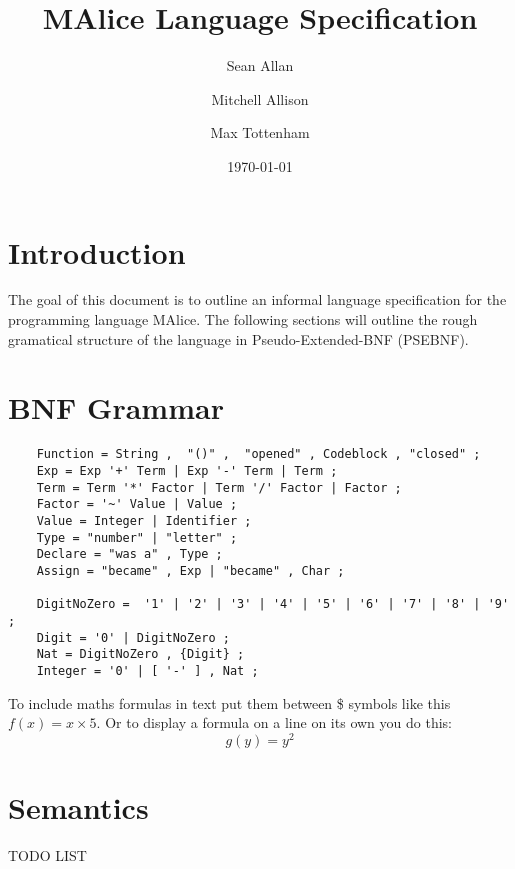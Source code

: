 \documentclass[a4wide, 11pt]{article}
\begin{document}
\title{MAlice Language Specification}

\author{Sean Allan \and Mitchell Allison \and Max Tottenham}

\date{\today}         %

\maketitle            %

\section{Introduction}

The goal of this document is to outline an informal language specification for 
the programming language MAlice. The following sections will outline the rough
gramatical structure of the language in Pseudo-Extended-BNF (PSEBNF). 

\section{BNF Grammar} 

\begin{verbatim}
	Function = String ,  "()" ,  "opened" , Codeblock , "closed" ;
	Exp = Exp '+' Term | Exp '-' Term | Term ;
	Term = Term '*' Factor | Term '/' Factor | Factor ;
	Factor = '~' Value | Value ;
	Value = Integer | Identifier ;
	Type = "number" | "letter" ;
	Declare = "was a" , Type ;
	Assign = "became" , Exp | "became" , Char ;
	
	DigitNoZero =  '1' | '2' | '3' | '4' | '5' | '6' | '7' | '8' | '9' ;
	Digit = '0' | DigitNoZero ; 
	Nat = DigitNoZero , {Digit} ;
	Integer = '0' | [ '-' ] , Nat ;

\end{verbatim}

To include maths formulas in text put them between \$ symbols like this
$f(x) = x \times 5$.
Or to display a formula on a line on its own you do this:
\[
    g(y) = y^2
\]

\section{Semantics}

TODO LIST
\end{document}

